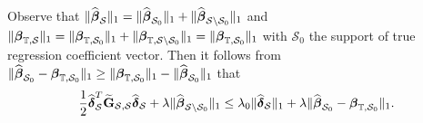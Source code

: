 \documentclass[11pt]{article}
\newcommand{\bG}{\mbox{\bf G}}
\newcommand{\bbeta}{\mbox{\boldmath $\beta$}}
\newcommand{\bdelta}{\mbox{\boldmath $\delta$}}
\begin{document}
Observe that $\|\widehat{\bbeta}_\mathcal{S}\|_1=\|\widehat{\bbeta}_{\mathcal{S}_0}\|_1+\|\widehat{\bbeta}_{\mathcal{S}\setminus\mathcal{S}_0}\|_1$ and $\|\bbeta_{\mathbb{T},\mathcal{S}}\|_1=\|\bbeta_{\mathbb{T}, \mathcal{S}_0}\|_1+\|\bbeta_{\mathbb{T},\mathcal{S}\setminus\mathcal{S}_0}\|_1=\|\bbeta_{\mathbb{T}, \mathcal{S}_0}\|_1$ with $\mathcal{S}_0$ the support of true regression coefficient vector. Then it follows from $\|\widehat{\bbeta}_{\mathcal{S}_0}-\bbeta_{\mathbb{T}, \mathcal{S}_0}\|_1\geq\|\bbeta_{\mathbb{T}, \mathcal{S}_0}\|_1-\|\widehat{\bbeta}_{\mathcal{S}_0}\|_1$ that
		\begin{eqnarray*}
			\dfrac{1}{2}\widehat{\bdelta}_\mathcal{S}^T\widetilde{\bG}_{\mathcal{S},\mathcal{S}}\widehat{\bdelta}_\mathcal{S}+\lambda\|\widehat{\bbeta}_{\mathcal{S}\setminus\mathcal{S}_0}\|_1 \le \lambda_{0}\|\widehat{\bdelta}_\mathcal{S}\|_1+\lambda\|\widehat{\bbeta}_{\mathcal{S}_0}-\bbeta_{\mathbb{T}, \mathcal{S}_0}\|_1.
		\end{eqnarray*}
	
\end{document}
